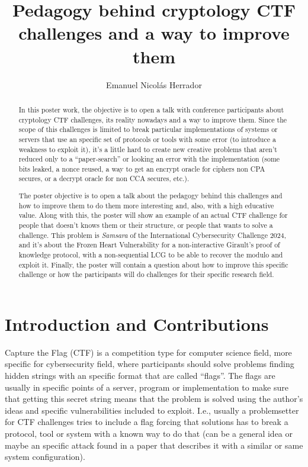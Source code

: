 \documentclass[runningheads]{llncs}
\title{Pedagogy behind cryptology CTF challenges and a way to improve them}
\author{Emanuel Nicolás Herrador}
\institute{
  Facultad de Matemática, Astronomía, Física y Computación, Universidad Nacional de Córdoba, Argentina \\ 
  \email{emanuel.nicolas.herrador@unc.edu.ar}
}
\begin{document}
  \maketitle

  \begin{abstract}
    In this poster work, the objective is to open a talk with conference participants about 
    cryptology CTF challenges, its reality nowadays and a way to improve them.
    Since the scope of this challenges is limited to break particular implementations of 
    systems or servers that use an specific set of protocols or tools with some error (to
    introduce a weakness to exploit it), it's a little hard to create new creative problems 
    that aren't reduced only to a ``paper-search'' or looking an error with the implementation 
    (some bits leaked, a nonce reused, a way to get an encrypt oracle for ciphers non CPA secures,
    or a decrypt oracle for non CCA secures, etc.). 

    The poster objective is to open a talk about the pedagogy behind this challenges and how to 
    improve them to do them more interesting and, also, with a high educative value.
    Along with this, the poster will show an example of an actual CTF challenge for people 
    that doesn't knows them or their structure, or people that wants to solve a challenge.
    This problem is \textit{Samsara} of the International Cybersecurity Challenge 2024, and it's
    about the Frozen Heart Vulnerability for a non-interactive Girault's proof of knowledge protocol,
    with a non-sequential LCG to be able to recover the modulo and exploit it.
    Finally, the poster will contain a question about how to improve this specific challenge 
    or how the participants will do challenges for their specific research field.
  \end{abstract}

  \section*{Introduction and Contributions}
  Capture the Flag (CTF) is a competition type for computer science field, more specific for 
  cybersecurity field, where participants should solve problems finding hidden strings with 
  an specific format that are called ``flags''.
  The flags are usually in specific points of a server, program or implementation to make sure 
  that getting this secret string means that the problem is solved using the author's ideas 
  and specific vulnerabilities included to exploit.
  I.e., usually a problemsetter for CTF challenges tries to include a flag forcing that 
  solutions has to break a protocol, tool or system with a known way to do that (can be 
  a general idea or maybe an specific attack found in a paper that describes it with a similar 
  or same system configuration).
  
\end{document}

